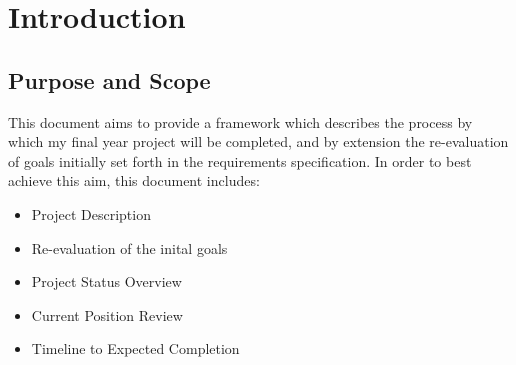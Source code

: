 
\section{Introduction} %



\subsection{Purpose and Scope} %

This document aims to provide a framework which describes the process by which my final year project will be completed, and by extension the re-evaluation of goals initially set forth in the requirements specification. In order to best achieve this aim, this document includes:

\begin{itemize}
\item Project Description
\item Re-evaluation of the inital goals
\item Project Status Overview
\item Current Position Review 
\item Timeline to Expected Completion
\end{itemize}

